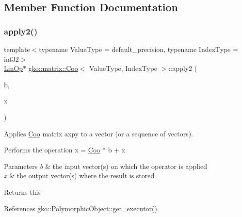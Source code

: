 \subsection{Member Function Documentation}
\mbox{\label{classgko_1_1matrix_1_1Coo_ad2e97eee0ad21f8896f4a82cc5ac8a50}} 
\subsubsection{\texorpdfstring{apply2()}{apply2()}\hspace{0.1cm}{\footnotesize\ttfamily [1/4]}}
{\footnotesize\ttfamily template$<$typename Value\+Type = default\+\_\+precision, typename Index\+Type = int32$>$ \\
\hyperlink{classgko_1_1LinOp}{Lin\+Op}$\ast$ \hyperlink{classgko_1_1matrix_1_1Coo}{gko\+::matrix\+::\+Coo}$<$ Value\+Type, Index\+Type $>$\+::apply2 (\begin{DoxyParamCaption}\item[{const \hyperlink{classgko_1_1LinOp}{Lin\+Op} $\ast$}]{b,  }\item[{\hyperlink{classgko_1_1LinOp}{Lin\+Op} $\ast$}]{x }\end{DoxyParamCaption})\hspace{0.3cm}{\ttfamily [inline]}}



Applies \hyperlink{classgko_1_1matrix_1_1Coo}{Coo} matrix axpy to a vector (or a sequence of vectors). 

Performs the operation x = \hyperlink{classgko_1_1matrix_1_1Coo}{Coo} $\ast$ b + x


\begin{DoxyParams}{Parameters}
{\em b} & the input vector(s) on which the operator is applied \\
\hline
{\em x} & the output vector(s) where the result is stored\\
\hline
\end{DoxyParams}
\begin{DoxyReturn}{Returns}
this 
\end{DoxyReturn}


References gko\+::\+Polymorphic\+Object\+::get\+\_\+executor().

\mbox{\label{classgko_1_1matrix_1_1Coo_a48b3fd46edc8b1770f2800e94871eb41}} 
